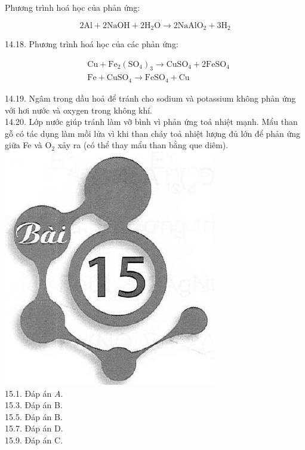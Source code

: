 \documentclass[10pt]{article}
\begin{document}
Phương trình hoá học của phản ứng:

$$
2 \mathrm{Al}+2 \mathrm{NaOH}+2 \mathrm{H}_{2} \mathrm{O} \rightarrow 2 \mathrm{NaAlO}_{2}+3 \mathrm{H}_{2}
$$

14.18. Phương trình hoá học của các phản ứng:

$$
\begin{aligned}
& \mathrm{Cu}+\mathrm{Fe}_{2}\left(\mathrm{SO}_{4}\right)_{3} \rightarrow \mathrm{CuSO}_{4}+2 \mathrm{FeSO}_{4} \\
& \mathrm{Fe}+\mathrm{CuSO}_{4} \rightarrow \mathrm{FeSO}_{4}+\mathrm{Cu}
\end{aligned}
$$

14.19. Ngâm trong dầu hoả để tránh cho sodium và potassium không phản ứng với hơi nước và oxygen trong không khí.\\
14.20. Lớp nước giúp tránh làm vỡ bình vì phản ứng toả nhiệt mạnh. Mẩu than gỗ có tác dụng làm mồi lửa vì khi than cháy toả nhiệt lượng đủ lớn để phản ứng giữa Fe và $\mathrm{O}_{2}$ xảy ra (có thể thay mẩu than bằng que diêm).\\
\includegraphics[max width=\textwidth, center]{2025_10_23_b4e16b74380d0f7e7700g-085}\\
15.1. Đáp án $A$.\\
15.3. Đáp án B.\\
15.5. Đáp án B.\\
15.7. Đáp án D.\\
15.9. Đáp án C.
\end{document}
